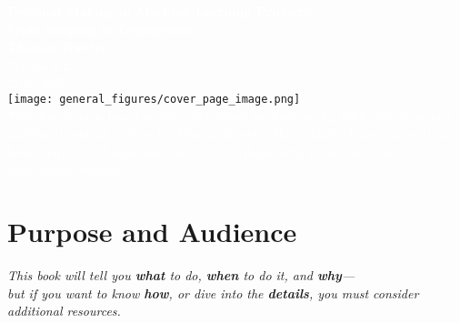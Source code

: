 \documentclass[12pt,openany]{book}
\begin{document}
\begin{titlepage}
    \centering
    \newpage
    \thispagestyle{empty}
    
    
    \vspace*{2cm}
    {\LARGE \textbf{\textcolor{white}{Decision Making in Machine Learning Projects:}}} \\
    \vspace{0.5cm}
    {\LARGE \textbf{\textcolor{white}{From Scoping to Deployment}}} \\

    
    \vspace{2cm}  %
    \Large{\textcolor{white}{\textbf{Thomas Rauter}}} \\
    
    \vspace{0.5cm}
    \large{\textcolor{white}{Version 0.2.1}} \\
    \large{\textcolor{white}{22.03.2025}} \\
    
    \vspace{1.5cm}
    \texttt{[image: general\_figures/cover\_page\_image.png]} \\
    
    \vfill
    \small{\textcolor{white}{This document is based on ideas developed by Andrew Ng, with extensions and additional content written by Thomas Rauter. The publicly shared material has been adapted and expanded upon in accordance with its intended use for educational purposes.}} 
    
\end{titlepage}


\setcounter{tocdepth}{1}

\tableofcontents

\newpage

\section{Purpose and Audience}

\begin{center}
\textit{This book will tell you \textcolor{green!50!black}{\textbf{what}} to do, \textcolor{green!50!black}{\textbf{when}} to do it, and \textcolor{green!50!black}{\textbf{why}}—\\
but if you want to know \textcolor{red!70!black}{\textbf{how}}, or dive into the \textcolor{red!70!black}{\textbf{details}}, you must consider additional resources.}
\end{center}
\end{document}
